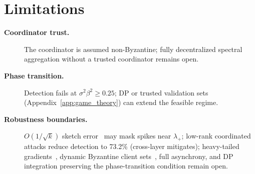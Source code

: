 \vspace{-4pt}
\section{Limitations}
\label{sec:limitations}

\begin{description}
\item[\textbf{Coordinator trust.}] The coordinator is assumed non-Byzantine; fully
  decentralized spectral aggregation without a trusted coordinator remains open.
\item[\textbf{Phase transition.}] Detection fails at $\sigma^2\beta^2 \geq 0.25$; DP or
  trusted validation sets (Appendix~\ref{app:game_theory}) can extend the feasible regime.
\item[\textbf{Robustness boundaries.}] $O(1/\sqrt{k})$ sketch error~\cite{ghashami_fd}
  may mask spikes near $\lambda_+$; low-rank coordinated attacks reduce detection to 73.2\%
  (cross-layer mitigates); heavy-tailed gradients~\cite{rmt_modern}, dynamic Byzantine
  client sets~\cite{bft_consensus}, full asynchrony, and DP integration preserving the
  phase-transition condition remain open.
\end{description}
